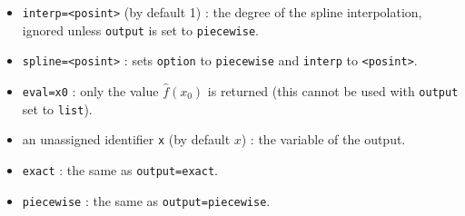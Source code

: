 \documentclass[a4paper,11pt]{book}
\begin{document}
\begin{itemize}
  \item {\tt interp=<posint>} (by default 1) : the degree of the spline interpolation, ignored unless {\tt output} is set to {\tt piecewise}.
  \item {\tt spline=<posint>} : sets {\tt option} to {\tt piecewise} and {\tt interp} to {\tt <posint>}.
  \item {\tt eval=x0} : only the value $\hat{f}(x_0)$ is returned (this cannot be used with {\tt output} set to {\tt list}).
  \item an unassigned identifier {\tt x} (by default $x$) : the variable of the output.
  \item {\tt exact} : the same as {\tt output=exact}.
  \item {\tt piecewise} : the same as {\tt output=piecewise}.
\end{itemize}
\end{document}
